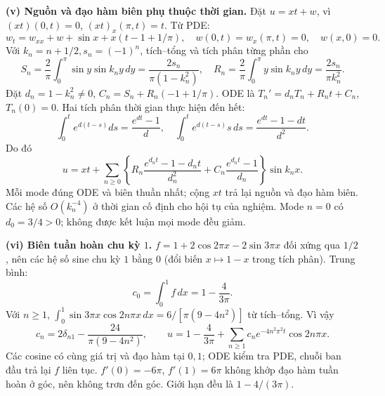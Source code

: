 \textbf{(v) Nguồn và đạo hàm biên phụ thuộc thời gian.}
Đặt $u=xt+w$, vì $(xt)(0,t)=0$, $(xt)_x(\pi,t)=t$. Từ PDE:
\[w_t=w_{xx}+w+\sin x+x(t-1+1/\pi),\quad
w(0,t)=w_x(\pi,t)=0,\quad w(x,0)=0.\]
Với $k_n=n+1/2,s_n=(-1)^n$, tích–tổng và tích phân từng phần cho
\[S_n=\frac2\pi\int_0^\pi\sin y\sin k_ny\,dy
=\frac{2s_n}{\pi(1-k_n^2)},\quad
R_n=\frac2\pi\int_0^\pi y\sin k_ny\,dy=\frac{2s_n}{\pi k_n^2}.\]
Đặt $d_n=1-k_n^2\ne0$, $C_n=S_n+R_n(-1+1/\pi)$. ODE là $T_n'=d_nT_n+R_nt+C_n$, $T_n(0)=0$. Hai tích phân thời gian thực hiện đến hết:
\[\int_0^te^{d(t-s)}ds=\frac{e^{dt}-1}d,\quad
\int_0^te^{d(t-s)}s\,ds=\frac{e^{dt}-1-dt}{d^2}.\]
Do đó
\[u=xt+\sum_{n\ge0}\left\{
R_n\frac{e^{d_nt}-1-d_nt}{d_n^2}
+C_n\frac{e^{d_nt}-1}{d_n}\right\}\sin k_nx.\]
Mỗi mode đúng ODE và biên thuần nhất; cộng $xt$ trả lại nguồn và đạo hàm biên. Các hệ số $O(k_n^{-4})$ ở thời gian cố định cho hội tụ của nghiệm. Mode $n=0$ có $d_0=3/4>0$; không được kết luận mọi mode đều giảm.

\textbf{(vi) Biên tuần hoàn chu kỳ $1$.}
$f=1+2\cos2\pi x-2\sin3\pi x$ đối xứng qua $1/2$, nên các hệ số sine chu kỳ $1$ bằng $0$ (đổi biến $x\mapsto1-x$ trong tích phân). Trung bình:
\[c_0=\int_0^1f\,dx=1-\frac4{3\pi}.\]
Với $n\ge1$, $\int_0^1\sin3\pi x\cos2n\pi x\,dx=6/[\pi(9-4n^2)]$ từ tích–tổng. Vì vậy
\[c_n=2\delta_{n1}-\frac{24}{\pi(9-4n^2)},\qquad
u=1-\frac4{3\pi}+\sum_{n\ge1}c_ne^{-4n^2\pi^2t}\cos2n\pi x.\]
Các cosine có cùng giá trị và đạo hàm tại $0,1$; ODE kiểm tra PDE, chuỗi ban đầu trả lại $f$ liên tục. $f'(0)=-6\pi$, $f'(1)=6\pi$ không khớp đạo hàm tuần hoàn ở góc, nên không trơn đến góc. Giới hạn đều là $1-4/(3\pi)$.
